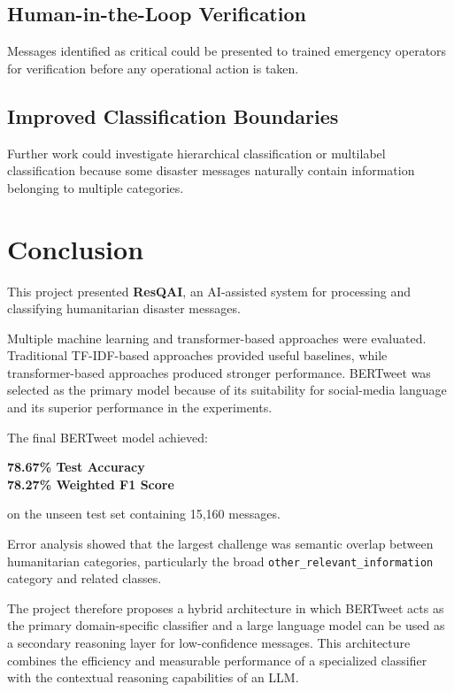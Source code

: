\documentclass[12pt,a4paper]{article}
\begin{document}
\subsection{Human-in-the-Loop Verification}

Messages identified as critical could be presented to trained emergency
operators for verification before any operational action is taken.

\subsection{Improved Classification Boundaries}

Further work could investigate hierarchical classification or multilabel
classification because some disaster messages naturally contain information
belonging to multiple categories.

\section{Conclusion}

This project presented \textbf{ResQAI}, an AI-assisted system for processing
and classifying humanitarian disaster messages.

Multiple machine learning and transformer-based approaches were evaluated.
Traditional TF-IDF-based approaches provided useful baselines, while
transformer-based approaches produced stronger performance. BERTweet was
selected as the primary model because of its suitability for social-media
language and its superior performance in the experiments.

The final BERTweet model achieved:

\begin{center}
\Large
\textbf{78.67\% Test Accuracy}\\[0.2cm]
\textbf{78.27\% Weighted F1 Score}
\end{center}

on the unseen test set containing 15,160 messages.

Error analysis showed that the largest challenge was semantic overlap between
humanitarian categories, particularly the broad
\texttt{other\_relevant\_information} category and related classes.

The project therefore proposes a hybrid architecture in which BERTweet acts
as the primary domain-specific classifier and a large language model can be
used as a secondary reasoning layer for low-confidence messages. This
architecture combines the efficiency and measurable performance of a
specialized classifier with the contextual reasoning capabilities of an LLM.
\end{document}

